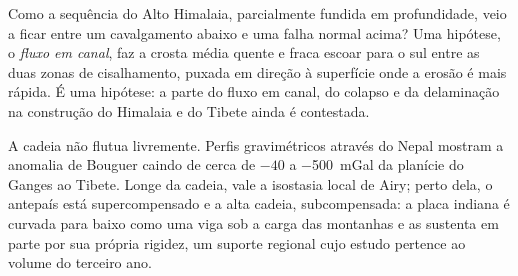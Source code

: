 \begin{omfigure}
\par{}
\end{omfigure}

Como a sequência do Alto Himalaia, parcialmente fundida em profundidade, veio a ficar entre um
cavalgamento abaixo e uma falha normal acima? Uma hipótese, o \emph{fluxo em canal}, faz a crosta média quente e
fraca escoar para o sul entre as duas zonas de cisalhamento, puxada em direção à
superfície onde a erosão é mais rápida. É uma hipótese: a parte do fluxo em canal, do colapso
e da delaminação na construção do Himalaia e do Tibete ainda é contestada.

A cadeia não flutua livremente. Perfis gravimétricos através do Nepal mostram a anomalia de Bouguer
caindo de cerca de $-40$ a \qty{-500}{mGal} da planície do Ganges ao Tibete. Longe da
cadeia, vale a isostasia local de Airy; perto dela, o antepaís está supercompensado e a alta
cadeia, subcompensada: a placa indiana é curvada para baixo como uma viga sob a carga das
montanhas e as sustenta em parte por sua própria rigidez, um suporte regional cujo estudo
pertence ao volume do terceiro ano.

